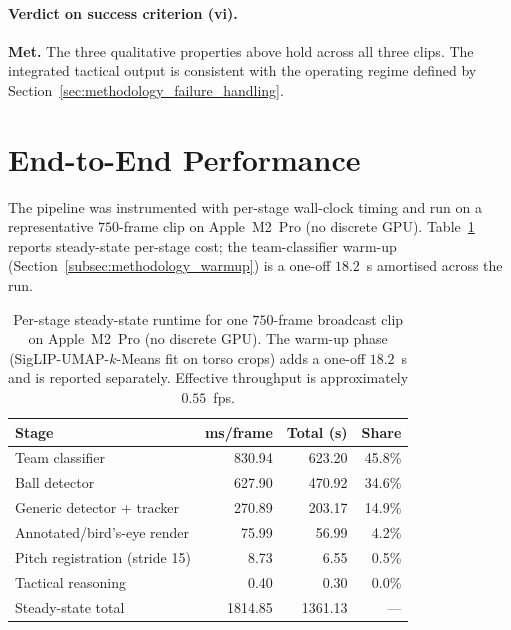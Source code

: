 \paragraph{Verdict on success criterion (vi).}
\textbf{Met.} The three qualitative properties above hold across all
three clips. The integrated tactical output is consistent with the
operating regime defined by Section~\ref{sec:methodology_failure_handling}.

\section{End-to-End Performance}
\label{sec:eval_runtime}

The pipeline was instrumented with per-stage wall-clock timing and
run on a representative $750$-frame clip on Apple~M2~Pro (no discrete
GPU). Table~\ref{tab:runtime_breakdown} reports steady-state per-stage
cost; the team-classifier warm-up
(Section~\ref{subsec:methodology_warmup}) is a one-off $18.2$~s
amortised across the run.

\begin{table}[h]
\centering
\small
\begin{tabular}{lrrr}
\toprule
Stage & ms/frame & Total (s) & Share \\
\midrule
Team classifier               & 830.94 & 623.20 & 45.8\% \\
Ball detector                 & 627.90 & 470.92 & 34.6\% \\
Generic detector + tracker    & 270.89 & 203.17 & 14.9\% \\
Annotated/bird's-eye render   &  75.99 &  56.99 & 4.2\% \\
Pitch registration (stride 15) &   8.73 &   6.55 & 0.5\% \\
Tactical reasoning            &   0.40 &   0.30 & 0.0\% \\
\midrule
Steady-state total            & 1814.85 & 1361.13 & --- \\
\bottomrule
\end{tabular}
\caption[Per-stage runtime on Apple M2 Pro for a 750-frame
clip.]{Per-stage steady-state runtime for one $750$-frame broadcast
clip on Apple~M2~Pro (no discrete GPU). The warm-up phase
(SigLIP-UMAP-$k$-Means fit on torso crops) adds a one-off $18.2$~s and
is reported separately. Effective throughput is approximately
$0.55$~fps.}
\label{tab:runtime_breakdown}
\end{table}

